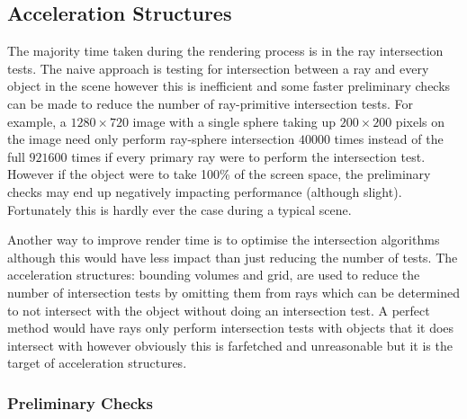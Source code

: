 \documentclass[final]{cmpreport}
\begin{document}
\subsection{Acceleration Structures}

The majority time taken during the rendering process is in the ray intersection tests. The naive approach is testing for intersection between a ray and every object in the scene however this is inefficient and some faster preliminary checks can be made to reduce the number of ray-primitive intersection tests. For example, a $1280 \times 720$ image with a single sphere taking up $200 \times 200$ pixels on the image need only perform ray-sphere intersection $40000$ times instead of the full $921600$ times if every primary ray were to perform the intersection test. However if the object were to take 100\% of the screen space, the preliminary checks may end up negatively impacting performance (although slight). Fortunately this is hardly ever the case during a typical scene.

Another way to improve render time is to optimise the intersection algorithms although this would have less impact than just reducing the number of tests. The acceleration structures: bounding volumes and grid, are used to reduce the number of intersection tests by omitting them from rays which can be determined to not intersect with the object without doing an intersection test. A perfect method would have rays only perform intersection tests with objects that it does intersect with however obviously this is farfetched and unreasonable but it is the target of acceleration structures.

\subsubsection{Preliminary Checks}
\end{document}
